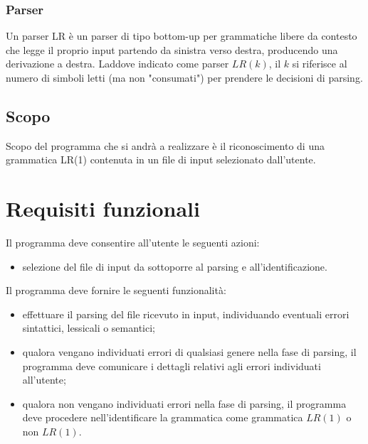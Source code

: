 \documentclass[12pt]{article}
\begin{document}
\subsubsection*{Parser}
Un parser LR è un parser di tipo bottom-up per grammatiche libere da contesto che legge il proprio input partendo da sinistra verso destra, producendo una derivazione a destra. Laddove indicato come parser $LR \left( k \right)$, il $k$ si riferisce al numero di simboli letti (ma non "consumati") per prendere le decisioni di parsing.

\subsection{Scopo}
Scopo del programma che si andrà a realizzare è il riconoscimento di una grammatica LR(1) contenuta in un file di input selezionato dall'utente. \par

\pagebreak

\section{Requisiti funzionali}

Il programma deve consentire all'utente le seguenti azioni:
\begin{itemize}
\item selezione del file di input da sottoporre al parsing e all'identificazione.
\end{itemize}
Il programma deve fornire le seguenti funzionalità:
\begin{itemize}
\item effettuare il parsing del file ricevuto in input, individuando eventuali errori sintattici, lessicali o semantici;
\item qualora vengano individuati errori di qualsiasi genere nella fase di parsing, il programma deve comunicare i dettagli relativi agli errori individuati all'utente;
\item qualora non vengano individuati errori nella fase di parsing, il programma deve procedere nell'identificare la grammatica come grammatica $LR \left( 1 \right)$ o non $LR \left( 1 \right)$.
\end{itemize}  
\end{document}
